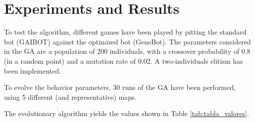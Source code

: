 \documentclass{llncs}
\begin{document}
%
\section{Experiments and Results}
\label{sec:experiments}
%

To test the algorithm, different games have been played by pitting the
standard bot (GAIBOT) against the optimized bot (GeneBot). The
parameters considered in the GA are a population of 200 individuals,
with a crossover probability of 0.8 (in a random point) and a mutation
rate of 0.02. A two-individuals elitism has been implemented.  

To evolve the behavior parameters, 30 runs of the GA have been performed, using 5 different (and representative) maps.

The evolutionary algorithm yields the values shown in Table \ref{tab:tabla_valores}. 
\end{document}
